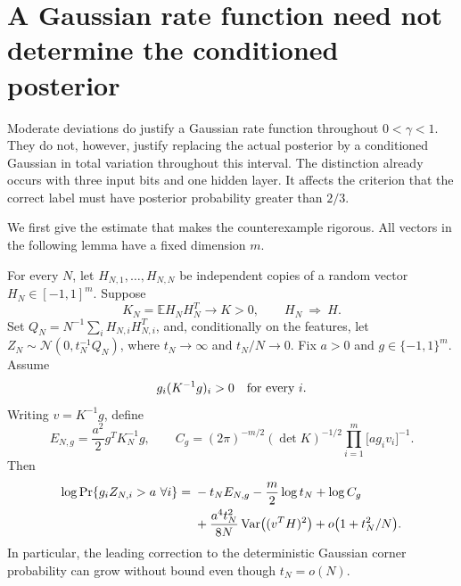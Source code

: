 \section{A Gaussian rate function need not determine the conditioned posterior}
\label{sec:non-gaussian-tie}

Moderate deviations do justify a Gaussian rate function throughout
$0<\gamma<1$. They do not, however, justify replacing the actual
posterior by a conditioned Gaussian in total variation throughout this
interval. The distinction already occurs with three input bits and one
hidden layer. It affects the criterion that the correct label must
have posterior probability greater than $2/3$.

We first give the estimate that makes the counterexample rigorous.
All vectors in the following lemma have a fixed dimension $m$.

\begin{lemma}
\label{lem:annealed-corner}
For every $N$, let $H_{N,1},\ldots,H_{N,N}$ be independent copies of a
random vector $H_N\in[-1,1]^m$. Suppose
\[
 K_N=\mathbb E H_NH_N^T\longrightarrow K>0,
 \qquad H_N\ \Longrightarrow\ H.
\]
Set $Q_N=N^{-1}\sum_i H_{N,i}H_{N,i}^T$, and, conditionally on the
features, let $Z_N\sim\mathcal N(0,t_N^{-1}Q_N)$, where
$t_N\to\infty$ and $t_N/N\to0$.
Fix $a>0$ and $g\in\{-1,1\}^m$. Assume
\[
 g_i(K^{-1}g)_i>0\quad\hbox{for every }i.
\]
Writing $v=K^{-1}g$, define
\[
 E_{N,g}=\frac{a^2}{2}g^TK_N^{-1}g,
 \qquad
 C_g=(2\pi)^{-m/2}(\det K)^{-1/2}
             \prod_{i=1}^m\bigl[a g_i v_i\bigr]^{-1}.
\]
Then
\begin{align}
 \log\Pr\{g_iZ_{N,i}>a\ \forall i\}
 ={}&-t_NE_{N,g}-\frac m2\log t_N+\log C_g\notag\\
 &+\frac{a^4t_N^2}{8N}
       \operatorname{Var}\bigl((v^TH)^2\bigr)
       +o\bigl(1+t_N^2/N\bigr).
 \label{eq:annealed-corner}
\end{align}
In particular, the leading correction to the deterministic Gaussian
corner probability can grow without bound even though $t_N=o(N)$.
\end{lemma}

